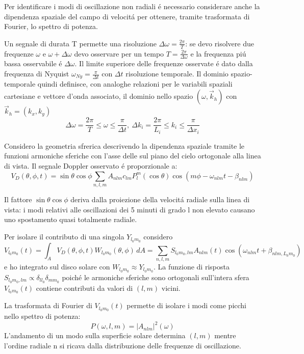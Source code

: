 \documentclass[../main.tex]{subfiles}
\begin{document}
Per identificare i modi di oscillazione non radiali \'e necessario considerare anche la dipendenza spaziale del campo di velocit\'a per ottenere, tramite trasformata di Fourier, lo spettro di potenza.

Un segnale di durata T permette una risoluzione $\Delta\omega=\frac{2\pi}{T}$: se devo risolvere due frequenze $\omega$ e $\omega+\Delta\omega$ devo osservare per un tempo $T=\frac{2\pi}{\Delta\omega}$ e la frequenza pi\'u bassa osservabile \'e $\Delta\omega$. Il limite superiore delle frequenze osservate \'e dato dalla frequenza di Nyquist $\omega_{Ny}=\frac{\pi}{\Delta t}$ con $\Delta t$ risoluzione temporale. Il dominio spazio-temporale quindi definisce, con analoghe relazioni per le variabili spaziali cartesiane e vettore d'onda associato, il dominio nello spazio $(\omega,\vec{k}_h)$ con $\vec{k}_h=(k_x,k_y)$
\begin{equation}
\Delta\omega=\frac{2\pi}{T}\leq\omega\leq\frac{\pi}{\Delta t},\ \Delta k_i=\frac{2\pi}{L_i}\leq k_i\leq\frac{\pi}{\Delta x_i}
\end{equation}

Considero la geometria sfrerica descrivendo la dipendenza spaziale tramite le funzioni armoniche sferiche con l'asse delle sul piano del cielo ortogonale alla linea di vista. Il segnale Doppler osservato \'e proporzionale a:
\begin{equation}
    V_D(\theta,\phi,t)=\sin{\theta}\cos{\phi}\sum_{n,l,m}A_{nlm}c_{lm}P_l^m(\cos{\theta})\cos{(m\phi-\omega_{nlm}t-\beta_{nlm})}
\end{equation}

Il fattore $\sin{\theta}\cos{\phi}$ deriva dalla proiezione della velocit\'a radiale sulla linea di vista: i modi relativi alle oscillazioni dei 5 minuti di grado l non elevato causano uno spostamento quasi totalmente radiale.

Per isolare il contributo di una singola $Y_{l_0m_0}$ considero
\begin{equation}
V_{l_0m_0}(t)=\int_AV_D(\theta,\phi,t)W_{l_0m_0}(\theta,\phi)\,dA=\sum_{n,l,m}S_{l_0m_0,lm}A_{nlm}(t)\cos{(\omega_{nlm}t+\beta_{nlm,L_0m_0})}
\end{equation}
e ho integrato sul disco solare con $W_{l_0m_0}\approx Y_{l_0m_0}$. La funzione di risposta $S_{l_0m_0,lm}\propto\delta_{ll_0}\delta_{mm_0}$ poich\'e le armoniche sferiche sono ortogonali sull'intera sfera $V_{l_0m_0}(t)$ contiene contributi da valori di $(l,m)$ vicini.

La trasformata di Fourier di $V_{l_0m_0}(t)$ permette di isolare i modi come picchi nello spettro di potenza:
\begin{equation}
P(\omega,l,m)=|A_{nlm}|^2(\omega)
\end{equation}
L'andamento di un modo sulla superficie solare determina $(l,m)$ mentre l'ordine radiale n si ricava dalla distribuzione delle frequenze di oscillazione.
\end{document}
